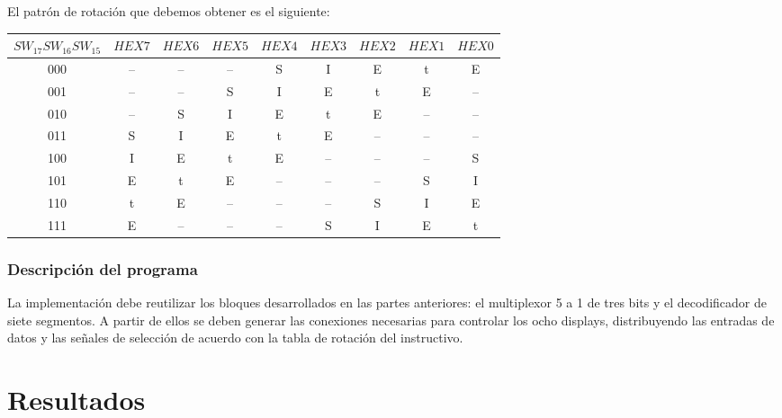 \documentclass[12pt]{report}
\begin{document}
El patrón de rotación que debemos obtener es el siguiente:

\begin{center}
\small
\begin{tabular}{|c|cccccccc|}
\hline
$SW_{17}SW_{16}SW_{15}$ & $HEX7$ & $HEX6$ & $HEX5$ & $HEX4$ & $HEX3$ & $HEX2$ & $HEX1$ & $HEX0$ \\
\hline
000 & -- & -- & -- & S & I & E & t & E \\
001 & -- & -- & S & I & E & t & E & -- \\
010 & -- & S & I & E & t & E & -- & -- \\
011 & S & I & E & t & E & -- & -- & -- \\
100 & I & E & t & E & -- & -- & -- & S \\
101 & E & t & E & -- & -- & -- & S & I \\
110 & t & E & -- & -- & -- & S & I & E \\
111 & E & -- & -- & -- & S & I & E & t \\
\hline
\end{tabular}
\end{center}

\subsubsection*{Descripción del programa}
La implementación debe reutilizar los bloques desarrollados en las partes anteriores: el multiplexor 5 a 1 de tres bits y el decodificador de siete segmentos. A partir de ellos se deben generar las conexiones necesarias para controlar los ocho displays, distribuyendo las entradas de datos y las señales de selección de acuerdo con la tabla de rotación del instructivo.


\section*{Resultados}

\end{document}
